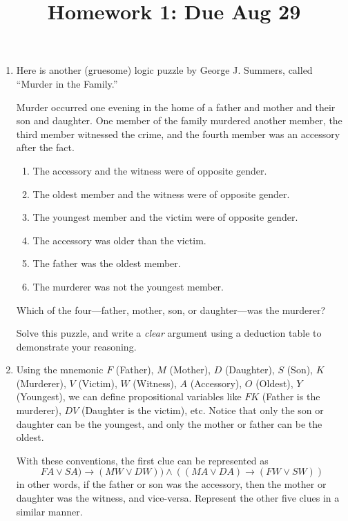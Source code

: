 \documentclass[12pt]{amsart}
\theoremstyle{definition}
\begin{document}
\title{Homework 1: Due Aug 29}

\maketitle

\begin{enumerate}

\item Here is another (gruesome) logic puzzle by George J. Summers, 
called “Murder in the Family.”

Murder occurred one evening in the home of a father and mother
and their son and daughter. One member of the family murdered
another member, the third member witnessed the crime, and the
fourth member was an accessory after the fact.

\begin{enumerate}
\item The accessory and the witness were of opposite gender.
\item The oldest member and the witness were of opposite gender.
\item The youngest member and the victim were of opposite gender.
\item The accessory was older than the victim.
\item The father was the oldest member.
\item The murderer was not the youngest member.
\end{enumerate}
Which of the four—father, mother, son, or daughter—was the murderer?

Solve this puzzle, and write a \textit{clear} argument using a 
deduction table to demonstrate your reasoning.

\item Using the mnemonic $F$ (Father), $M$ (Mother), $D$ (Daughter), 
$S$ (Son), $K$ (Murderer), $V$ (Victim), $W$ (Witness), $A$ 
(Accessory), $O$ (Oldest), $Y$ (Youngest), we can define propositional 
variables like $FK$ (Father is the murderer), $DV$ (Daughter is 
the victim), etc.
Notice that only the son or daughter can be the youngest, and only the mother
or father can be the oldest.

With these conventions, the first clue can be represented as
\begin{displaymath}
FA \lor SA) \to (MW \lor DW)) \land ((MA \lor DA) \to (FW \lor SW))
\end{displaymath}
in other words, if the father or son was the accessory, then the mother or
daughter was the witness, and vice-versa. Represent the other five clues in a
similar manner.


\end{enumerate}
\end{document}
